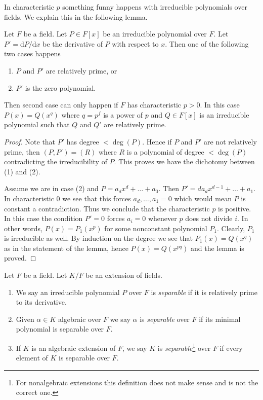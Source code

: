 \noindent
In characteristic $p$ something funny happens with irreducible polynomials
over fields. We explain this in the following lemma.

\begin{lemma}
\label{lemma-irreducible-polynomials}
Let $F$ be a field. Let $P \in F[x]$ be an irreducible polynomial over $F$.
Let $P' = \text{d}P/\text{d}x$ be the derivative of $P$ with respect
to $x$. Then one of the following two cases happens
\begin{enumerate}
\item $P$ and $P'$ are relatively prime, or
\item $P'$ is the zero polynomial.
\end{enumerate}
Then second case can only happen if $F$ has characteristic $p > 0$.
In this case $P(x) = Q(x^q)$ where $q = p^f$ is a power of $p$ and
$Q \in F[x]$ is an irreducible polynomial such that $Q$ and $Q'$
are relatively prime.
\end{lemma}

\begin{proof}
Note that $P'$ has degree $< \deg(P)$. Hence if $P$ and $P'$ are not relatively
prime, then $(P, P') = (R)$ where $R$ is a polynomial of degree $< \deg(P)$
contradicting the irreducibility of $P$. This proves we have the dichotomy
between (1) and (2).

\medskip\noindent
Assume we are in case (2) and $P = a_d x^d + \ldots + a_0$. Then
$P' = da_d x^{d - 1} + \ldots + a_1$. In characteristic $0$ we see
that this forces $a_d, \ldots, a_1 = 0$ which would mean $P$ is constant
a contradiction. Thus we conclude that the characteristic $p$ is positive.
In this case the condition $P' = 0$ forces $a_i = 0$ whenever $p$ does
not divide $i$.
In other words, $P(x) = P_1(x^p)$ for some nonconstant polynomial $P_1$.
Clearly, $P_1$ is irreducible as well. By induction on the degree we
see that $P_1(x) = Q(x^q)$ as in the statement of the lemma, hence
$P(x) = Q(x^{pq})$ and the lemma is proved.
\end{proof}

\begin{definition}
\label{definition-separable}
Let $F$ be a field. Let $K/F$ be an extension of fields.
\begin{enumerate}
\item We say an irreducible polynomial $P$ over $F$ is {\it separable}
if it is relatively prime to its derivative.
\item Given $\alpha \in K$ algebraic over $F$ we say $\alpha$ is
{\it separable} over $F$ if its minimal polynomial is separable over $F$.
\item If $K$ is an algebraic extension of $F$, we say $K$ is
{\it separable}\footnote{For nonalgebraic extensions
this definition does not make sense and is not the correct one.}
over $F$ if every element of $K$ is separable over $F$.
\end{enumerate}
\end{definition}

